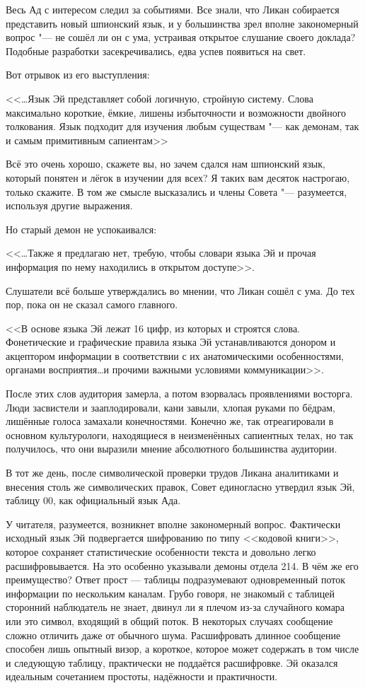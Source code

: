 \documentclass[a4paper,10pt,fleqn]{book}
\newcommand{\ldotst}{\so{...}\xspace}
\begin{document}
Весь Ад с интересом следил за событиями.
Все знали, что Ликан собирается представить новый шпионский язык, и у большинства зрел вполне закономерный вопрос "--- не сошёл ли он с ума, устраивая открытое слушание своего доклада?
Подобные разработки засекречивались, едва успев появиться на свет.

Вот отрывок из его выступления:

<<\dots Язык Эй представляет собой логичную, стройную систему.
Слова максимально короткие, ёмкие, лишены избыточности и возможности двойного толкования.
Язык подходит для изучения любым существам "--- как демонам, так и самым примитивным сапиентам\ldotst>>

Всё это очень хорошо, скажете вы, но зачем сдался нам шпионский язык, который понятен и лёгок в изучении для всех?
Я таких вам десяток настрогаю, только скажите.
В том же смысле высказались и члены Совета "--- разумеется, используя другие выражения.

Но старый демон не успокаивался:

<<\dots Также я предлагаю\ldotst нет, требую, чтобы словари языка Эй и прочая информация по нему находились в открытом доступе>>.

Слушатели всё больше утверждались во мнении, что Ликан сошёл с ума.
До тех пор, пока он не сказал самого главного.

<<В основе языка Эй лежат 16 цифр, из которых и строятся слова.
Фонетические и графические правила языка Эй устанавливаются донором и акцептором информации в соответствии с их анатомическими особенностями, органами восприятия\ldots и прочими важными условиями коммуникации>>.

После этих слов аудитория замерла, а потом взорвалась проявлениями восторга.
Люди засвистели и зааплодировали, кани завыли, хлопая руками по бёдрам, лишённые голоса замахали конечностями.
Конечно же, так отреагировали в основном культурологи, находящиеся в неизменённых сапиентных телах, но так получилось, что они выразили мнение абсолютного большинства аудитории.

В тот же день, после символической проверки трудов Ликана аналитиками и внесения столь же символических правок, Совет единогласно утвердил язык Эй, таблицу 00, как официальный язык Ада.

У читателя, разумеется, возникнет вполне закономерный вопрос.
Фактически исходный язык Эй подвергается шифрованию по типу <<кодовой книги>>, которое сохраняет статистические особенности текста и довольно легко расшифровывается.
На это особенно указывали демоны отдела 214.
В чём же его преимущество?
Ответ прост --- таблицы подразумевают одновременный поток информации по нескольким каналам.
Грубо говоря, не знакомый с таблицей сторонний наблюдатель не знает, двинул ли я плечом из-за случайного комара или это символ, входящий в общий поток.
В некоторых случаях сообщение сложно отличить даже от обычного шума.
Расшифровать длинное сообщение способен лишь опытный визор, а короткое, которое может содержать в том числе и следующую таблицу, практически не поддаётся расшифровке.
Эй оказался идеальным сочетанием простоты, надёжности и практичности.
\end{document}
